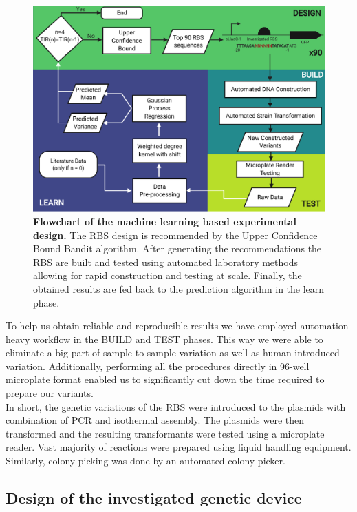 \documentclass{article}
\begin{document}
\begin{figure}[h]
    \centering
    \includegraphics[scale=0.7]{plots/Main_Paper/flowchart.pdf}
    \caption{\textbf{Flowchart of the machine learning based experimental design.} The RBS design is recommended by the Upper Confidence Bound Bandit algorithm. After generating the recommendations the RBS are built and tested using automated laboratory methods allowing for rapid construction and testing at scale. Finally, the obtained results are fed back to the prediction algorithm in the learn phase. }
    \label{fig: Flowchart}
\end{figure}
To help us obtain reliable and reproducible results we have employed automation-heavy workflow in the BUILD and TEST phases.
This way we were able to eliminate a big part of sample-to-sample variation as well as human-introduced variation.
Additionally, performing all the procedures directly in 96-well microplate format enabled us to significantly cut down the time required to prepare our variants.\\

In short, the genetic variations of the RBS were introduced to the plasmids with combination of PCR and isothermal assembly. 
The plasmids were then transformed and the resulting transformants were tested using a  microplate reader.
Vast majority of reactions were prepared using liquid handling equipment.
Similarly, colony picking was done by an automated colony picker.\\

\subsection{Design of the investigated genetic device}
\end{document}
